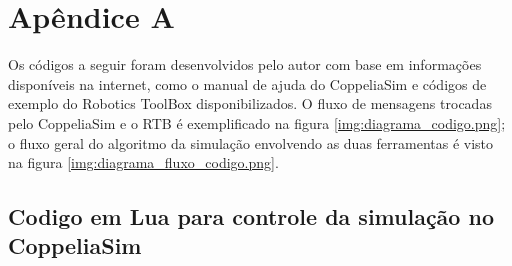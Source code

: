 \chapter{Apêndice A} \label{apen:apendice1}


Os códigos a seguir foram desenvolvidos pelo autor com base em informações disponíveis na internet, como o manual de ajuda do CoppeliaSim e códigos de exemplo do Robotics ToolBox disponibilizados. O fluxo de mensagens trocadas pelo CoppeliaSim e o RTB é exemplificado na figura \ref{img:diagrama_codigo.png}; o fluxo geral do algoritmo da simulação envolvendo as duas ferramentas é visto na figura \ref{img:diagrama_fluxo_codigo.png}.



\newpage


\section{Codigo em Lua para controle da simulação no CoppeliaSim}
